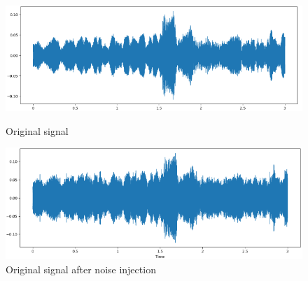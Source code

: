 \begin{figure}[H]
        \centering
        
        \begin{minipage}{0.49\textwidth}
            \centering
            \includegraphics[width=\linewidth]{images/noise_augmentation_original_signal_intensity.png}
            \caption*{Original signal}
        \end{minipage}%
        \hfill%
        \begin{minipage}{0.49\textwidth}
            \centering
            \includegraphics[width=\linewidth]{images/noise_augmentation_augmented_signal_01_intensity.png}
            \caption*{Original signal after noise injection}
        \end{minipage}
        
        \vspace{0.5cm}
        

\end{figure}
